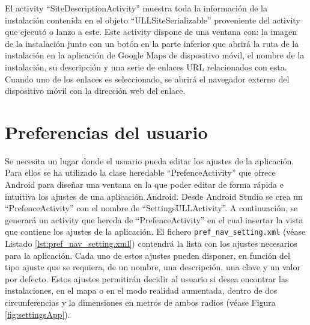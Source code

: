 
    

El activity ``SiteDescriptionActivity'' muestra toda la información de la instalación contenida en el objeto ``ULLSiteSerializable'' proveniente del activity que ejecutó o lanzo a este. Este activity dispone de una ventana con: la imagen de la instalación junto con un botón en la parte inferior que abrirá la ruta de la instalación en la aplicación de Google Maps de dispositivo móvil, el nombre de la instalación, su descripción y una serie de enlaces URL relacionados con esta. Cuando uno de los enlaces es seleccionado, se abrirá el navegador externo del dispositivo móvil con la dirección web del enlace.

 

 
     
\section{Preferencias del usuario}

Se necesita un lugar donde el usuario pueda editar los ajustes de la aplicación. Para ellos se ha utilizado la clase heredable ``PrefenceActivity'' que ofrece Android para diseñar una ventana en la que poder editar de forma rápida e intuitiva los ajustes de una aplicación Android. Desde Android Studio se crea un ``PrefenceActivity'' con el nombre de ``SettingsULLActivity''. A continuación, se generará un activity que hereda de ``PrefenceActivity'' en el cual insertar la vista que contiene los ajustes de la aplicación. El fichero \texttt{pref\_nav\_setting.xml} (véase Listado \ref{lst:pref_nav_setting.xml}) contendrá la lista con los ajustes necesarios para la aplicación. Cada uno de estos ajustes pueden disponer, en función del tipo ajuste que se requiera, de un nombre, una descripción, una clave y un valor por defecto. Estos ajustes permitirán decidir al usuario si desea encontrar las instalaciones, en el mapa o en el modo realidad aumentada, dentro de dos circunferencias y la dimensiones en metros de ambos radios (véase Figura \ref{fig:settingsApp}).
 


